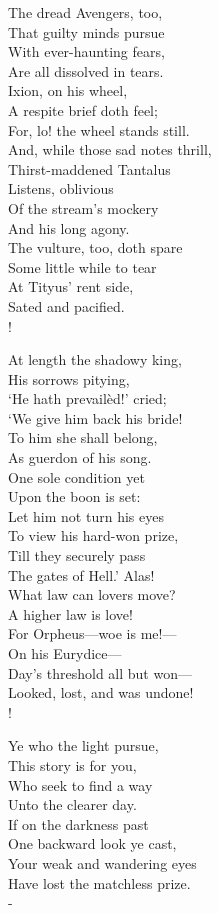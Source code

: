 \documentclass[12pt]{book}
\newenvironment{ipoem}[1]%
  {\setcounter{poemindentevery}{#1}\begin{poem}\small}%
  {\end{poem}\setcounter{poemindentevery}{0}}
\begin{document}
\begin{ipoem}{0}
    The dread Avengers, too, \\
    That guilty minds pursue \\
    With ever-haunting fears, \\
    Are all dissolved in tears. \\
    Ixion, on his wheel, \\
    A respite brief doth feel; \\
    For, lo! the wheel stands still. \\
    And, while those sad notes thrill, \\
    Thirst-maddened Tantalus \\
    Listens, oblivious \\
    Of the stream's mockery \\
    And his long agony. \\
    The vulture, too, doth spare \\
    Some little while to tear \\
    At Tityus' rent side, \\
    Sated and pacified. \\!

    At length the shadowy king, \\
    His sorrows pitying, \\
    `He hath prevailèd!' cried; \\
    `We give him back his bride! \\
    To him she shall belong, \\
    As guerdon of his song. \\
    One sole condition yet \\
    Upon the boon is set: \\
    Let him not turn his eyes \\
    To view his hard-won prize, \\
    Till they securely pass \\
    The gates of Hell.' Alas! \\
    What law can lovers move? \\
    A higher law is love! \\
    For Orpheus---woe is me!--- \\
    On his Eurydice--- \\
    Day's threshold all but won--- \\
    Looked, lost, and was undone! \\!

    Ye who the light pursue, \\
    This story is for you, \\
    Who seek to find a way \\
    Unto the clearer day. \\
    If on the darkness past \\
    One backward look ye cast, \\
    Your weak and wandering eyes \\
    Have lost the matchless prize. \\-
\end{ipoem}
\end{document}

